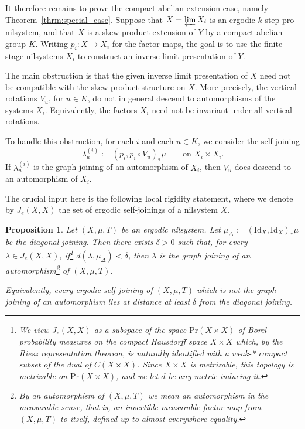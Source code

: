 \documentclass[12pt]{amsart}
\theoremstyle{plain}
\newtheorem{proposition}[theorem]{Proposition}
\theoremstyle{definition}
\begin{document}
It therefore remains to prove the compact abelian extension case, namely Theorem~\ref{thrm:special_case}. Suppose that $X = \varprojlim X_i$ is an ergodic $k$-step pro-nilsystem, and that $X$ is a skew-product extension of $Y$ by a compact abelian group $K$. Writing $p_i\colon X \to X_i$ for the factor maps, the goal is to use the finite-stage nilsystems $X_i$ to construct an inverse limit presentation of $Y$.

The main obstruction is that the given inverse limit presentation of $X$ need not be compatible with the skew-product structure on $X$. More precisely, the vertical rotations $V_u$, for $u \in K$, do not in general descend to automorphisms of the systems $X_i$. Equivalently, the factors $X_i$ need not be invariant under all vertical rotations.

To handle this obstruction, for each $i$ and each $u \in K$, we consider the self-joining
\[
\lambda_u^{(i)} := (p_i, p_i \circ V_u)_* \mu \qquad \text{on } X_i \times X_i.
\]
If $\lambda_u^{(i)}$ is the graph joining of an automorphism of $X_i$, then $V_u$ does descend to an automorphism of $X_i$.

The crucial input here is the following local rigidity statement, where we denote by $J_e(X,X)$ the set of ergodic self-joinings of a nilsystem $X$. 

\begin{proposition}\label{prop:neighbourhood_diag_joining_graph}
Let $(X,\mu,T)$ be an ergodic nilsystem. Let $\mu_\Delta := (\mathrm{Id}_X,\mathrm{Id}_X)_*\mu$ be the diagonal joining. Then there exists $\delta>0$ such that, for every
$\lambda\in J_e(X,X)$, if\footnote{We view $J_e(X,X)$ as a subspace of the space $\mathrm{Pr}(X\times X)$  of Borel probability measures on the compact Hausdorff space $X\times X$ which, by the Riesz representation theorem, is naturally identified with a weak-* compact subset of the dual of $C(X\times X)$. 
Since $X\times X$ is metrizable, this topology is metrizable on $\mathrm{Pr}(X\times X)$, and we let $d$ be any metric inducing it.} $d(\lambda,\mu_\Delta)<\delta$, then $\lambda$ is the graph joining of an automorphism\footnote{By an automorphism of $(X,\mu,T)$ we mean an automorphism in the measurable sense, that is, an invertible measurable factor map from $(X,\mu,T)$ to itself, defined up to almost-everywhere equality.} of $(X,\mu,T)$. 

Equivalently, every ergodic self-joining of $(X,\mu,T)$ which is not the
graph joining of an automorphism lies at distance at least $\delta$ from the
diagonal joining. 
\end{proposition}
\end{document}
